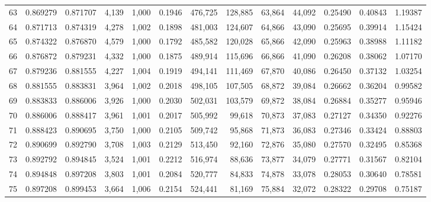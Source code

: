 \begin{tabular}{rrrrrrrrrrrrr}
63  &  0.869279 &  0.871707 &   4,139 &  1,000 &                                     0.1946 &  476,725 &  128,885 &   63,864 &   44,092 &  0.25490 &  0.40843 &  1.19387 \\
64  &  0.871713 &  0.874319 &   4,278 &  1,002 &                                     0.1898 &  481,003 &  124,607 &   64,866 &   43,090 &  0.25695 &  0.39914 &  1.15424 \\
65  &  0.874322 &  0.876870 &   4,579 &  1,000 &                                     0.1792 &  485,582 &  120,028 &   65,866 &   42,090 &  0.25963 &  0.38988 &  1.11182 \\
66  &  0.876872 &  0.879231 &   4,332 &  1,000 &                                     0.1875 &  489,914 &  115,696 &   66,866 &   41,090 &  0.26208 &  0.38062 &  1.07170 \\
67  &  0.879236 &  0.881555 &   4,227 &  1,004 &                                     0.1919 &  494,141 &  111,469 &   67,870 &   40,086 &  0.26450 &  0.37132 &  1.03254 \\
68  &  0.881555 &  0.883831 &   3,964 &  1,002 &                                     0.2018 &  498,105 &  107,505 &   68,872 &   39,084 &  0.26662 &  0.36204 &  0.99582 \\
69  &  0.883833 &  0.886006 &   3,926 &  1,000 &                                     0.2030 &  502,031 &  103,579 &   69,872 &   38,084 &  0.26884 &  0.35277 &  0.95946 \\
70  &  0.886006 &  0.888417 &   3,961 &  1,001 &                                     0.2017 &  505,992 &   99,618 &   70,873 &   37,083 &  0.27127 &  0.34350 &  0.92276 \\
71  &  0.888423 &  0.890695 &   3,750 &  1,000 &                                     0.2105 &  509,742 &   95,868 &   71,873 &   36,083 &  0.27346 &  0.33424 &  0.88803 \\
72  &  0.890699 &  0.892790 &   3,708 &  1,003 &                                     0.2129 &  513,450 &   92,160 &   72,876 &   35,080 &  0.27570 &  0.32495 &  0.85368 \\
73  &  0.892792 &  0.894845 &   3,524 &  1,001 &                                     0.2212 &  516,974 &   88,636 &   73,877 &   34,079 &  0.27771 &  0.31567 &  0.82104 \\
74  &  0.894848 &  0.897208 &   3,803 &  1,001 &                                     0.2084 &  520,777 &   84,833 &   74,878 &   33,078 &  0.28053 &  0.30640 &  0.78581 \\
75  &  0.897208 &  0.899453 &   3,664 &  1,006 &                                     0.2154 &  524,441 &   81,169 &   75,884 &   32,072 &  0.28322 &  0.29708 &  0.75187 \\

\end{tabular}
